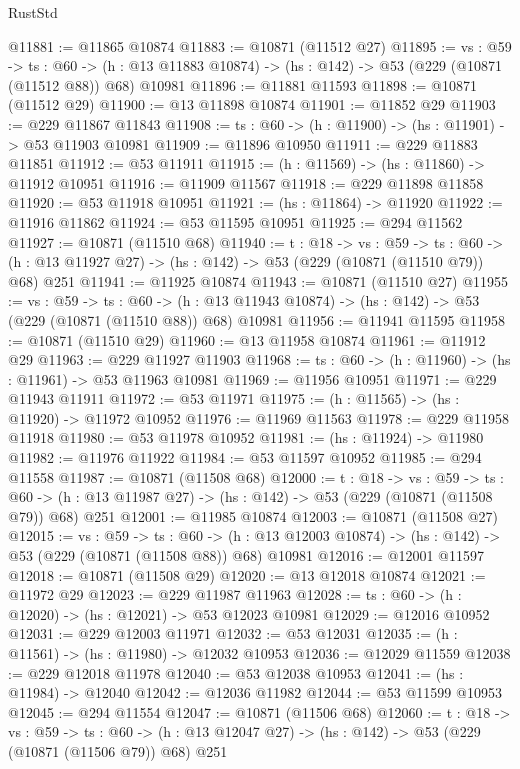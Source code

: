 \begin{lexlean}{RustStd}
\begin{coremodule}
@11881 := @11865 @10874
@11883 := @10871 (@11512 @27)
@11895 := {vs : @59} ->
  {ts : @60} ->
  (h : @13 @11883 @10874) -> (hs : @142) -> @53 (@229 (@10871 (@11512 @88)) @68) @10981
@11896 := @11881 @11593
@11898 := @10871 (@11512 @29)
@11900 := @13 @11898 @10874
@11901 := @11852 @29
@11903 := @229 @11867 @11843
@11908 := {ts : @60} -> (h : @11900) -> (hs : @11901) -> @53 @11903 @10981
@11909 := @11896 @10950
@11911 := @229 @11883 @11851
@11912 := @53 @11911
@11915 := (h : @11569) -> (hs : @11860) -> @11912 @10951
@11916 := @11909 @11567
@11918 := @229 @11898 @11858
@11920 := @53 @11918 @10951
@11921 := (hs : @11864) -> @11920
@11922 := @11916 @11862
@11924 := @53 @11595 @10951
@11925 := @294 @11562
@11927 := @10871 (@11510 @68)
@11940 := {t : @18} ->
  {vs : @59} ->
  {ts : @60} -> (h : @13 @11927 @27) -> (hs : @142) -> @53 (@229 (@10871 (@11510 @79)) @68) @251
@11941 := @11925 @10874
@11943 := @10871 (@11510 @27)
@11955 := {vs : @59} ->
  {ts : @60} ->
  (h : @13 @11943 @10874) -> (hs : @142) -> @53 (@229 (@10871 (@11510 @88)) @68) @10981
@11956 := @11941 @11595
@11958 := @10871 (@11510 @29)
@11960 := @13 @11958 @10874
@11961 := @11912 @29
@11963 := @229 @11927 @11903
@11968 := {ts : @60} -> (h : @11960) -> (hs : @11961) -> @53 @11963 @10981
@11969 := @11956 @10951
@11971 := @229 @11943 @11911
@11972 := @53 @11971
@11975 := (h : @11565) -> (hs : @11920) -> @11972 @10952
@11976 := @11969 @11563
@11978 := @229 @11958 @11918
@11980 := @53 @11978 @10952
@11981 := (hs : @11924) -> @11980
@11982 := @11976 @11922
@11984 := @53 @11597 @10952
@11985 := @294 @11558
@11987 := @10871 (@11508 @68)
@12000 := {t : @18} ->
  {vs : @59} ->
  {ts : @60} -> (h : @13 @11987 @27) -> (hs : @142) -> @53 (@229 (@10871 (@11508 @79)) @68) @251
@12001 := @11985 @10874
@12003 := @10871 (@11508 @27)
@12015 := {vs : @59} ->
  {ts : @60} ->
  (h : @13 @12003 @10874) -> (hs : @142) -> @53 (@229 (@10871 (@11508 @88)) @68) @10981
@12016 := @12001 @11597
@12018 := @10871 (@11508 @29)
@12020 := @13 @12018 @10874
@12021 := @11972 @29
@12023 := @229 @11987 @11963
@12028 := {ts : @60} -> (h : @12020) -> (hs : @12021) -> @53 @12023 @10981
@12029 := @12016 @10952
@12031 := @229 @12003 @11971
@12032 := @53 @12031
@12035 := (h : @11561) -> (hs : @11980) -> @12032 @10953
@12036 := @12029 @11559
@12038 := @229 @12018 @11978
@12040 := @53 @12038 @10953
@12041 := (hs : @11984) -> @12040
@12042 := @12036 @11982
@12044 := @53 @11599 @10953
@12045 := @294 @11554
@12047 := @10871 (@11506 @68)
@12060 := {t : @18} ->
  {vs : @59} ->
  {ts : @60} -> (h : @13 @12047 @27) -> (hs : @142) -> @53 (@229 (@10871 (@11506 @79)) @68) @251

\end{coremodule}
\end{lexlean}
